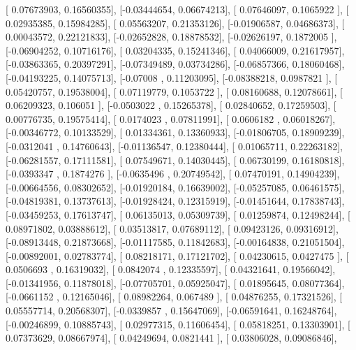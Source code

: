 \documentclass{article}
\begin{document}
       [ 0.07673903,  0.16560355],
       [-0.03444654,  0.06674213],
       [ 0.07646097,  0.1065922 ],
       [ 0.02935385,  0.15984285],
       [ 0.05563207,  0.21353126],
       [-0.01906587,  0.04686373],
       [ 0.00043572,  0.22121833],
       [-0.02652828,  0.18878532],
       [-0.02626197,  0.1872005 ],
       [-0.06904252,  0.10716176],
       [ 0.03204335,  0.15241346],
       [ 0.04066009,  0.21617957],
       [-0.03863365,  0.20397291],
       [-0.07349489,  0.03734286],
       [-0.06857366,  0.18060468],
       [-0.04193225,  0.14075713],
       [-0.07008   ,  0.11203095],
       [-0.08388218,  0.0987821 ],
       [ 0.05420757,  0.19538004],
       [ 0.07119779,  0.1053722 ],
       [ 0.08160688,  0.12078661],
       [ 0.06209323,  0.106051  ],
       [-0.0503022 ,  0.15265378],
       [ 0.02840652,  0.17259503],
       [ 0.00776735,  0.19575414],
       [ 0.0174023 ,  0.07811991],
       [ 0.0606182 ,  0.06018267],
       [-0.00346772,  0.10133529],
       [ 0.01334361,  0.13360933],
       [-0.01806705,  0.18909239],
       [-0.0312041 ,  0.14760643],
       [-0.01136547,  0.12380444],
       [ 0.01065711,  0.22263182],
       [-0.06281557,  0.17111581],
       [ 0.07549671,  0.14030445],
       [ 0.06730199,  0.16180818],
       [-0.0393347 ,  0.1874276 ],
       [-0.0635496 ,  0.20749542],
       [ 0.07470191,  0.14904239],
       [-0.00664556,  0.08302652],
       [-0.01920184,  0.16639002],
       [-0.05257085,  0.06461575],
       [-0.04819381,  0.13737613],
       [-0.01928424,  0.12315919],
       [-0.01451644,  0.17838743],
       [-0.03459253,  0.17613747],
       [ 0.06135013,  0.05309739],
       [ 0.01259874,  0.12498244],
       [ 0.08971802,  0.03888612],
       [ 0.03513817,  0.07689112],
       [ 0.09423126,  0.09316912],
       [-0.08913448,  0.21873668],
       [-0.01117585,  0.11842683],
       [-0.00164838,  0.21051504],
       [-0.00892001,  0.02783774],
       [ 0.08218171,  0.17121702],
       [ 0.04230615,  0.0427475 ],
       [ 0.0506693 ,  0.16319032],
       [ 0.0842074 ,  0.12335597],
       [ 0.04321641,  0.19566042],
       [-0.01341956,  0.11878018],
       [-0.07705701,  0.05925047],
       [ 0.01895645,  0.08077364],
       [-0.0661152 ,  0.12165046],
       [ 0.08982264,  0.067489  ],
       [ 0.04876255,  0.17321526],
       [ 0.05557714,  0.20568307],
       [-0.0339857 ,  0.15647069],
       [-0.06591641,  0.16248764],
       [-0.00246899,  0.10885743],
       [ 0.02977315,  0.11606454],
       [ 0.05818251,  0.13303901],
       [ 0.07373629,  0.08667974],
       [ 0.04249694,  0.0821441 ],
       [ 0.03806028,  0.09086846],
\end{document}
